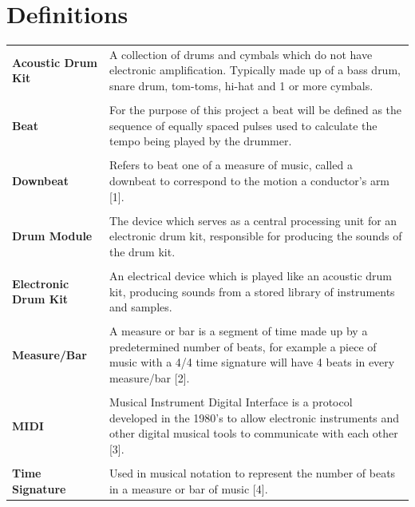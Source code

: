 \documentclass[a4paper, 11pt]{article}
\begin{document}
\section*{Definitions}
\begin{tabular}{l p{4.5in}  }\\
\textbf{Acoustic Drum Kit} & A collection of drums and cymbals which do not have electronic amplification. Typically made up of a bass drum, snare drum, tom-toms, hi-hat and 1 or more cymbals.\\\\
\textbf{Beat} & For the purpose of this project a beat will be defined as the sequence of equally spaced pulses used to calculate the tempo being played by the drummer.\\\\
\textbf{Downbeat} & Refers to beat one of a measure of music, called a downbeat to correspond to the motion a conductor's arm [1].\\\\
\textbf{Drum Module} & The device which serves as a central processing unit for an electronic drum kit, responsible for producing the sounds of the drum kit.\\\\
\textbf{Electronic Drum Kit} & An electrical device which is played like an acoustic drum kit, producing sounds from a stored library of instruments and samples.\\\\
\textbf{Measure/Bar} & A measure or bar is a segment of time made up by a predetermined number of beats, for example a piece of music with a 4/4 time signature will have 4 beats in every measure/bar [2].\\\\
\textbf{MIDI} & Musical Instrument Digital Interface is a protocol developed in the 1980's to allow electronic instruments and other digital musical tools to communicate with each other [3].\\\\
\textbf{Time Signature} & Used in musical notation to represent the number of beats in a measure or bar of music [4].
\end{tabular}
\clearpage
\end{document}

